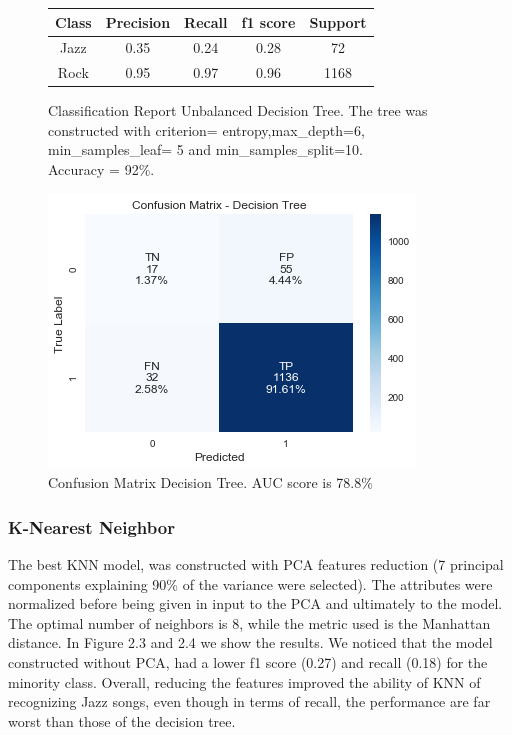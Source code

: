 \begin{figure}[!htb]
   \begin{minipage}{0.56\textwidth}
     \begin{tabular}{ccccc}
     \hline
     \textbf{Class} & \textbf{Precision} & \textbf{Recall} & \textbf{f1 score} & \textbf{Support} \\ \hline
     Jazz          & 0.35               & 0.24            & 0.28        & 72             \\ \hline
     Rock            & 0.95               & 0.97            & 0.96        & 1168            
     \end{tabular}
     \caption{Classification Report Unbalanced Decision Tree. The tree was constructed with criterion= entropy,max\_depth=6, min\_samples\_leaf= 5 and min\_samples\_split=10.\\ Accuracy = 92\%.}
     \label{Classification report: Test set Ripper}
   \end{minipage}\hfill
   \begin{minipage}{0.42\textwidth}
     \centering
     \includegraphics[width=0.7\linewidth]{images/cfm-unbalanced-decisiontree.png}
     \caption{Confusion Matrix Decision Tree. AUC score is 78.8\%}\label{Fig:Data2}
   \end{minipage}
\end{figure}

\subsubsection{K-Nearest Neighbor}
The best KNN model, was constructed with PCA features reduction (7 principal components explaining 90\% of the variance were selected). The attributes were normalized before being given in input to the PCA and ultimately to the model. The optimal number of neighbors is 8, while the metric used is the Manhattan distance. In Figure 2.3 and 2.4 we show the results. We noticed that the model constructed without PCA, had a lower f1 score (0.27) and recall (0.18) for the minority class. Overall, reducing the features improved the ability of KNN of recognizing Jazz songs, even though in terms of recall, the performance are far worst than those of the decision tree. 

